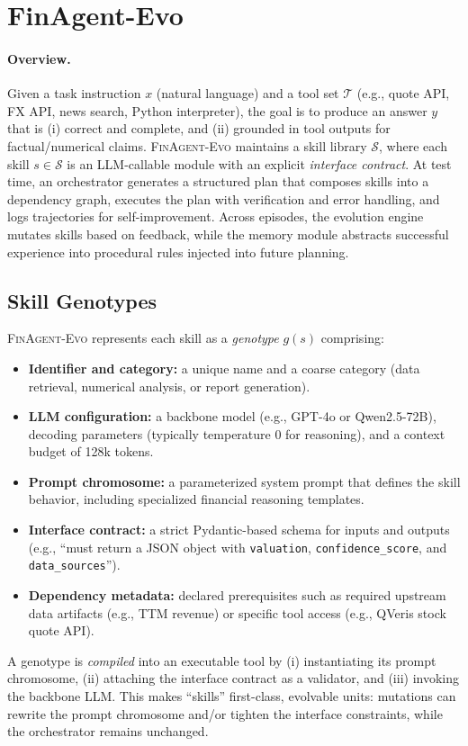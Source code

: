 \documentclass{article}
\begin{document}
\section{FinAgent-Evo}
\paragraph{Overview.}
Given a task instruction $x$ (natural language) and a tool set $\mathcal{T}$ (e.g., quote API, FX API, news search, Python interpreter), the goal is to produce an answer $y$ that is (i) correct and complete, and (ii) grounded in tool outputs for factual/numerical claims. \textsc{FinAgent-Evo} maintains a skill library $\mathcal{S}$, where each skill $s \in \mathcal{S}$ is an LLM-callable module with an explicit \emph{interface contract}. At test time, an orchestrator generates a structured plan that composes skills into a dependency graph, executes the plan with verification and error handling, and logs trajectories for self-improvement. Across episodes, the evolution engine mutates skills based on feedback, while the memory module abstracts successful experience into procedural rules injected into future planning.

\subsection{Skill Genotypes}
\textsc{FinAgent-Evo} represents each skill as a \emph{genotype} $g(s)$ comprising:
\begin{itemize}
  \item \textbf{Identifier and category:} a unique name and a coarse category (data retrieval, numerical analysis, or report generation).
  \item \textbf{LLM configuration:} a backbone model (e.g., GPT-4o or Qwen2.5-72B), decoding parameters (typically temperature 0 for reasoning), and a context budget of 128k tokens.
  \item \textbf{Prompt chromosome:} a parameterized system prompt that defines the skill behavior, including specialized financial reasoning templates.
  \item \textbf{Interface contract:} a strict Pydantic-based schema for inputs and outputs (e.g., ``must return a JSON object with \texttt{valuation}, \texttt{confidence\_score}, and \texttt{data\_sources}'').
  \item \textbf{Dependency metadata:} declared prerequisites such as required upstream data artifacts (e.g., TTM revenue) or specific tool access (e.g., QVeris stock quote API).
\end{itemize}
\noindent
A genotype is \emph{compiled} into an executable tool by (i) instantiating its prompt chromosome, (ii) attaching the interface contract as a validator, and (iii) invoking the backbone LLM. This makes ``skills'' first-class, evolvable units: mutations can rewrite the prompt chromosome and/or tighten the interface constraints, while the orchestrator remains unchanged.
\end{document}
